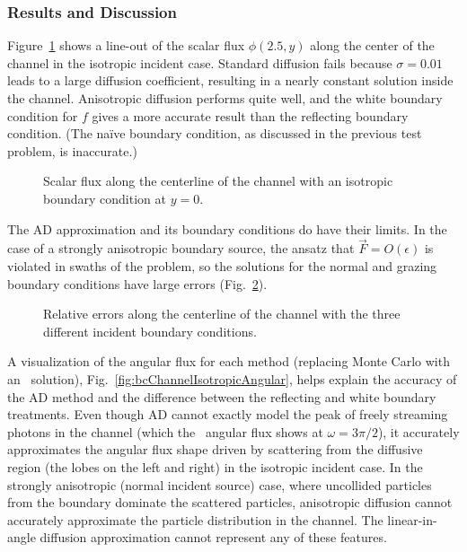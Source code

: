 \subsubsection{Results and Discussion}

Figure~\ref{fig:adbcIsotropic} shows a line-out of the scalar flux $\phi(2.5,y)$
along the center of the channel in the isotropic incident case. Standard
diffusion fails because $\sigma=0.01$ leads to a
large diffusion coefficient, resulting in a nearly constant solution inside the
channel. Anisotropic diffusion performs quite well, and the
white boundary condition for $f$ gives a more accurate result than the
reflecting boundary condition. (The na\"ive boundary condition, as discussed in
the previous test problem, is inaccurate.)

\begin{figure}[htb]
  \centering
  \centering\small
  \hspace{-.25in}%
  
  \caption{Scalar flux along the centerline of the channel with an isotropic
  boundary condition at $y=0$.}
  \label{fig:adbcIsotropic}
\end{figure}

The AD approximation and its boundary conditions do have their limits. In the
case of a strongly anisotropic boundary source, the ansatz that
$\vec{F} = O(\epsilon)$ is violated in swaths of the problem, so the solutions
for the normal and grazing boundary conditions have large errors
(Fig.~\ref{fig:adbcRelErr}).

\begin{figure}[htb]
  \centering
  \centering\small
  \hspace{-.25in}%
  
  \caption{Relative errors along the centerline of the channel with the three
  different incident boundary conditions.}
  \label{fig:adbcRelErr}
\end{figure}

A visualization of the angular flux for each method (replacing Monte Carlo with
an \SN\ solution), Fig.~\ref{fig:bcChannelIsotropicAngular}, helps explain the
accuracy
of the AD method and the difference between the reflecting and white boundary
treatments. Even though AD cannot exactly model the peak of freely streaming
photons in the channel (which the \SN\ angular flux shows at $\omega=3\pi/2$),
it accurately approximates the angular flux shape driven by scattering from the
diffusive region (the lobes on the left and right) in the isotropic incident
case. In the strongly anisotropic (normal incident source) case, where
uncollided particles from the boundary dominate the scattered particles,
anisotropic diffusion cannot accurately approximate the particle
distribution in the channel.
The linear-in-angle diffusion approximation cannot represent any of these
features.

